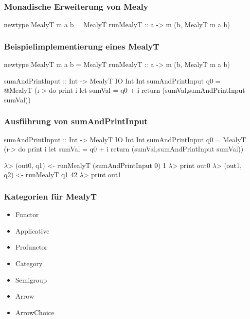 \begin{frame}[fragile]
  \frametitle{Monadische Erweiterung von {\ttfamily Mealy}}
  \begin{haskell}[label={lst:haskell-mealy},caption={[Monadische Mealy]Monadische Mealy}]
newtype MealyT m a b = MealyT {
  runMealyT :: a -> m (b, MealyT m a b)
}
  \end{haskell}
\end{frame}

\begin{frame}[fragile]
  \frametitle{Beispielimplementierung eines {\ttfamily MealyT}}

  \begin{haskell}[label={lst:haskell-mealy}]
newtype MealyT m a b = MealyT {
  runMealyT :: a -> m (b, MealyT m a b)
}
  \end{haskell}

  \begin{haskell}
sumAndPrintInput :: Int -> MealyT IO Int Int
sumAndPrintInput q0 = @\pause@ MealyT (\i -> do
  print i
  let sumVal = q0 + i
  return (sumVal,sumAndPrintInput sumVal))
  \end{haskell}
\end{frame}

\begin{frame}[fragile]
  \frametitle{Ausführung von {\ttfamily sumAndPrintInput}}

  \begin{haskell}
sumAndPrintInput :: Int -> MealyT IO Int Int
sumAndPrintInput q0 = MealyT (\i -> do
  print i
  let sumVal = q0 + i
  return (sumVal,sumAndPrintInput sumVal))
  \end{haskell}
  \begin{semiverbatim}
\(\lambda\)> (out0, q1) <- runMealyT (sumAndPrintInput 0) 1\pause
\(\lambda\)> print out0 \pause
\(\lambda\)> (out1, q2) <- runMealyT q1 42\pause
\(\lambda\)> print out1
  \end{semiverbatim}
\end{frame}

\begin{frame}

  \frametitle{Kategorien für {\ttfamily MealyT}}

  \begin{itemize}
    \item {\ttfamily Functor}
    \item {\ttfamily Applicative}
    \item {\ttfamily Profunctor}
    \item {\ttfamily Category}
    \item {\ttfamily Semigroup}
    \item {\ttfamily Arrow}
    \item {\ttfamily ArrowChoice}
  \end{itemize}
\end{frame}

